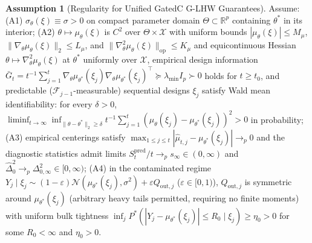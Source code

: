 \documentclass[11pt,a4paper,reqno]{amsart}
\theoremstyle{definition}
\newtheorem{assumption}[theorem]{Assumption}
\theoremstyle{remark}
\newcommand{\R}{\mathbb{R}}
\newcommand{\Ncal}{\mathcal{N}}
\newcommand{\Xcal}{\mathcal{X}}
\begin{document}
\begin{assumption}[Regularity for Unified GatedC G-LHW Guarantees]\label{assump:regularity}
Assume: (A1) $\sigma_\theta(\xi) \equiv \sigma > 0$ on compact parameter domain $\Theta \subset \R^p$ containing $\theta^*$ in its interior; (A2) $\theta \mapsto \mu_\theta(\xi)$ is $C^2$ over $\Theta \times \Xcal$ with uniform bounds $|\mu_\theta(\xi)| \le M_\mu$, $\|\nabla_\theta \mu_\theta(\xi)\|_2 \le L_\mu$, and $\|\nabla_\theta^2 \mu_\theta(\xi)\|_{\mathrm{op}} \le K_\mu$ and equicontinuous Hessian $\theta \mapsto \nabla_\theta^2 \mu_\theta(\xi)$ at $\theta^*$ uniformly over $\Xcal$, empirical design information $\bar{G}_t = t^{-1}\sum_{j=1}^t \nabla_\theta \mu_{\theta^*}(\xi_j)\nabla_\theta \mu_{\theta^*}(\xi_j)^\top \succeq \lambda_{\min} I_p \succ 0$ holds for $t \ge t_0$, and predictable ($\mathcal{F}_{j-1}$-measurable) sequential designs $\xi_j$ satisfy Wald mean identifiability: for every $\delta > 0$, $\liminf_{t\to\infty} \inf_{\|\theta - \theta^*\|_2 \ge \delta} t^{-1}\sum_{j=1}^t (\mu_\theta(\xi_j) - \mu_{\theta^*}(\xi_j))^2 > 0$ in probability; (A3) empirical centerings satisfy $\max_{1\le j \le t} |\hat{\mu}_{t,j} - \mu_{\theta^*}(\xi_j)| \to_p 0$ and the diagnostic statistics admit limits $S_t^{\mathrm{pred}} / t \to_p s_\infty \in (0, \infty)$ and $\hat{\Delta}_0^2 \to_p \Delta_{0,\infty}^2 \in [0, \infty)$; (A4) in the contaminated regime $Y_j \mid \xi_j \sim (1 - \varepsilon)\Ncal(\mu_{\theta^*}(\xi_j), \sigma^2) + \varepsilon Q_{\mathrm{out}, j}$ ($\varepsilon \in [0, 1)$), $Q_{\mathrm{out}, j}$ is symmetric around $\mu_{\theta^*}(\xi_j)$ (arbitrary heavy tails permitted, requiring no finite moments) with uniform bulk tightness $\inf_j P^*(|Y_j - \mu_{\theta^*}(\xi_j)| \le R_0 \mid \xi_j) \ge \eta_0 > 0$ for some $R_0 < \infty$ and $\eta_0 > 0$.
\end{assumption}
\end{document}
